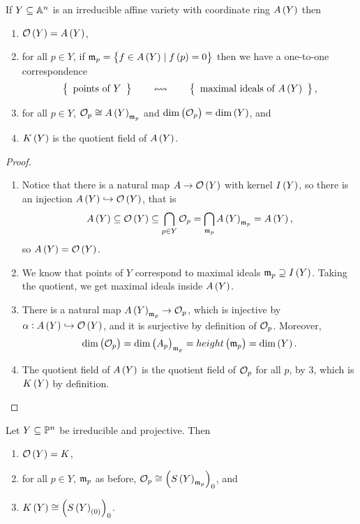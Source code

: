 \begin{theorem}
If $ Y \subseteq \A^n $ is an irreducible affine variety with coordinate ring $ A\br{Y} $ then
\begin{enumerate}
\item $ \OO\br{Y} = A\br{Y} $,
\item for all $ p \in Y $, if $ \mm_p = \cbr{f \in A\br{Y} \mid f\br{p} = 0} $ then we have a one-to-one correspondence
$$ \correspondence{\text{points of} \ Y}{\text{maximal ideals of} \ A\br{Y}}, $$
\item for all $ p \in Y $, $ \OO_p \cong A\br{Y}_{\mm_p} $ and $ \dim\br{\OO_p} = \dim\br{Y} $, and
\item $ K\br{Y} $ is the quotient field of $ A\br{Y} $.
\end{enumerate}
\end{theorem}

\begin{proof}
\hfill
\begin{enumerate}
\item Notice that there is a natural map $ A \to \OO\br{Y} $ with kernel $ I\br{Y} $, so there is an injection $ A\br{Y} \hookrightarrow \OO\br{Y} $, that is
$$ A\br{Y} \subseteq \OO\br{Y} \subseteq \bigcap_{p \in Y} \OO_p = \bigcap_{\mm_p} A\br{Y}_{\mm_p} = A\br{Y}, $$
so $ A\br{Y} = \OO\br{Y} $.
\item We know that points of $ Y $ correspond to maximal ideals $ \mm_p \supseteq I\br{Y} $. Taking the quotient, we get maximal ideals inside $ A\br{Y} $.
\item There is a natural map $ A\br{Y}_{\mm_p} \to \OO_p $, which is injective by $ \alpha : A\br{Y} \hookrightarrow \OO\br{Y} $, and it is surjective by definition of $ \OO_p $. Moreover,
$$ \dim\br{\OO_p} = \dim\br{A_p}_{\mm_p} = height\br{\mm_p} = \dim\br{Y}. $$
\item The quotient field of $ A\br{Y} $ is the quotient field of $ \OO_p $ for all $ p $, by $ 3 $, which is $ K\br{Y} $ by definition.
\end{enumerate}
\end{proof}

\begin{theorem}
Let $ Y \subseteq \P^n $ be irreducible and projective. Then
\begin{enumerate}
\item $ \OO\br{Y} = K $,
\item for all $ p \in Y $, $ \mm_p $ as before, $ \OO_p \cong \br{S\br{Y}_{\mm_p}}_0 $, and
\item $ K\br{Y} \cong \br{S\br{Y}_{\br{0}}}_0 $.
\end{enumerate}
\end{theorem}

